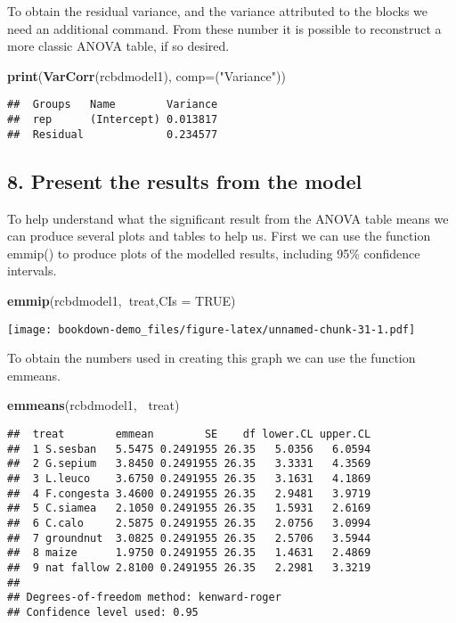 \documentclass[]{book}
\newenvironment{Shaded}{\begin{snugshade}}{\end{snugshade}}
\newcommand{\KeywordTok}[1]{\textcolor[rgb]{0.13,0.29,0.53}{\textbf{#1}}}
\newcommand{\DataTypeTok}[1]{\textcolor[rgb]{0.13,0.29,0.53}{#1}}
\newcommand{\StringTok}[1]{\textcolor[rgb]{0.31,0.60,0.02}{#1}}
\newcommand{\OtherTok}[1]{\textcolor[rgb]{0.56,0.35,0.01}{#1}}
\newcommand{\OperatorTok}[1]{\textcolor[rgb]{0.81,0.36,0.00}{\textbf{#1}}}
\newcommand{\NormalTok}[1]{#1}
\theoremstyle{definition}
\theoremstyle{definition}
\theoremstyle{definition}
\theoremstyle{remark}
\begin{document}
To obtain the residual variance, and the variance attributed to the
blocks we need an additional command. From these number it is possible
to reconstruct a more classic ANOVA table, if so desired.

\begin{Shaded}
\begin{Highlighting}[]
\KeywordTok{print}\NormalTok{(}\KeywordTok{VarCorr}\NormalTok{(rcbdmodel1), }\DataTypeTok{comp=}\NormalTok{(}\StringTok{"Variance"}\NormalTok{))}
\end{Highlighting}
\end{Shaded}

\begin{verbatim}
##  Groups   Name        Variance
##  rep      (Intercept) 0.013817
##  Residual             0.234577
\end{verbatim}

\subsection{8. Present the results from the
model}\label{present-the-results-from-the-model}

To help understand what the significant result from the ANOVA table
means we can produce several plots and tables to help us. First we can
use the function emmip() to produce plots of the modelled results,
including 95\% confidence intervals.

\begin{Shaded}
\begin{Highlighting}[]
\KeywordTok{emmip}\NormalTok{(rcbdmodel1,}\OperatorTok{~}\NormalTok{treat,}\DataTypeTok{CIs =} \OtherTok{TRUE}\NormalTok{)}
\end{Highlighting}
\end{Shaded}

\texttt{[image: bookdown-demo\_files/figure-latex/unnamed-chunk-31-1.pdf]}

To obtain the numbers used in creating this graph we can use the
function emmeans.

\begin{Shaded}
\begin{Highlighting}[]
\KeywordTok{emmeans}\NormalTok{(rcbdmodel1, }\OperatorTok{~}\NormalTok{treat)}
\end{Highlighting}
\end{Shaded}

\begin{verbatim}
##  treat        emmean        SE    df lower.CL upper.CL
##  1 S.sesban   5.5475 0.2491955 26.35   5.0356   6.0594
##  2 G.sepium   3.8450 0.2491955 26.35   3.3331   4.3569
##  3 L.leuco    3.6750 0.2491955 26.35   3.1631   4.1869
##  4 F.congesta 3.4600 0.2491955 26.35   2.9481   3.9719
##  5 C.siamea   2.1050 0.2491955 26.35   1.5931   2.6169
##  6 C.calo     2.5875 0.2491955 26.35   2.0756   3.0994
##  7 groundnut  3.0825 0.2491955 26.35   2.5706   3.5944
##  8 maize      1.9750 0.2491955 26.35   1.4631   2.4869
##  9 nat fallow 2.8100 0.2491955 26.35   2.2981   3.3219
## 
## Degrees-of-freedom method: kenward-roger 
## Confidence level used: 0.95
\end{verbatim}
\end{document}
